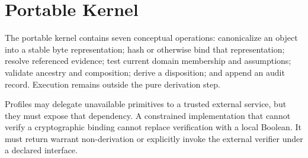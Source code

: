 \section{Portable Kernel}
The portable kernel contains seven conceptual operations: canonicalize an object into a stable byte representation; hash or otherwise bind that representation; resolve referenced evidence; test current domain membership and assumptions; validate ancestry and composition; derive a disposition; and append an audit record. Execution remains outside the pure derivation step.

Profiles may delegate unavailable primitives to a trusted external service, but they must expose that dependency. A constrained implementation that cannot verify a cryptographic binding cannot replace verification with a local Boolean. It must return warrant non-derivation or explicitly invoke the external verifier under a declared interface.